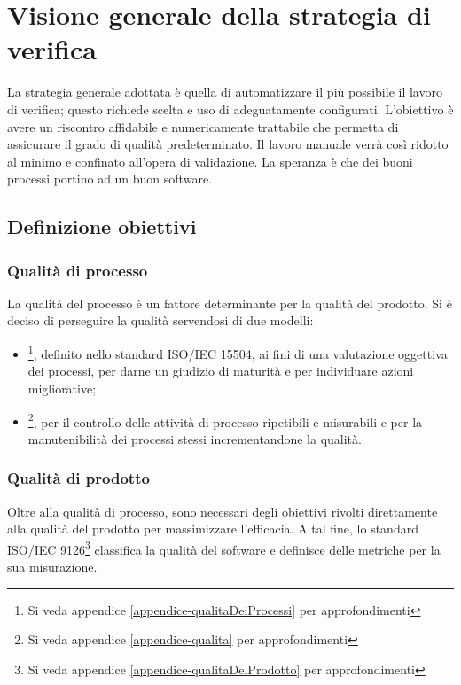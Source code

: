 \section{Visione generale della strategia di verifica}

La strategia generale adottata è quella di automatizzare il più possibile il lavoro di verifica; questo richiede scelta e uso di  adeguatamente configurati. L'obiettivo è avere un riscontro affidabile e numericamente trattabile che permetta di assicurare il grado di qualità predeterminato. Il lavoro manuale verrà così ridotto al minimo e confinato all'opera di validazione.
La speranza è che dei buoni processi portino ad un buon software.

	\subsection{Definizione obiettivi}

		\subsubsection{Qualità di processo}
		La qualità del processo è un fattore determinante per la qualità del prodotto. Si è deciso di perseguire la qualità servendosi di due modelli:

		\begin{itemize}
			\item {}\footnote{Si veda appendice \ref{appendice-qualitaDeiProcessi} per approfondimenti}, definito nello standard ISO/IEC 15504, ai fini di una valutazione oggettiva dei processi, per darne un giudizio di maturità e per individuare azioni migliorative;
			\item {}\footnote{Si veda appendice \ref{appendice-qualita} per approfondimenti}, per il controllo delle attività di processo ripetibili e misurabili e per la manutenibilità dei processi stessi incrementandone la qualità.
		\end{itemize}

		\subsubsection{Qualità di prodotto}
		Oltre alla qualità di processo, sono necessari degli obiettivi rivolti direttamente alla qualità del prodotto per massimizzare l'efficacia. A tal fine, lo standard ISO/IEC 9126\footnote{Si veda appendice \ref{appendice-qualitaDelProdotto} per approfondimenti} classifica la qualità del software e definisce delle metriche per la sua misurazione.

